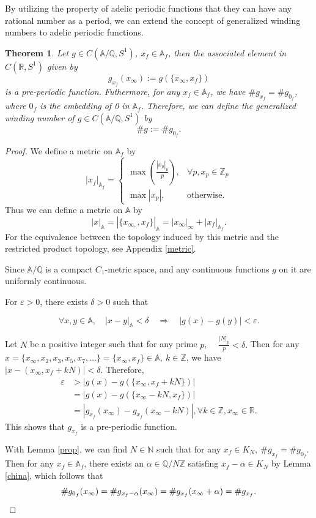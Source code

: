 \documentclass[11pt]{article}
\newtheorem{theorem}{Theorem}[section]  %
\newcommand{\A}{\mathbb{A}}
\theoremstyle{remark}
\begin{document}
By utilizing  the property of adelic periodic functions that they can have any rational number as a period, we can extend the concept of generalized winding numbers to adelic periodic functions. 
\begin{theorem}\label{gonggongwind}
    Let \( g \in C(\mathbb{A}/\mathbb{Q}, S^1) \), \( x_f \in \mathbb{A}_f \), then the associated element in \( C(\mathbb{R}, S^1) \) given by  
\[
g_{x_f}(x_\infty) := g(\{x_\infty, x_f\})
\]  
is a pre-periodic function. Futhermore, for any \( x_f \in \mathbb{A}_f\), we have \(\#g_{x_f}=\#g_{0_f}\), where \(0_f\) is the embedding of 0 in \(\A_f\). Therefore, we can define the generalized winding number of \( g \in C(\mathbb{A}/\mathbb{Q}, S^1) \) by
$$
\#g:=\#g_{0_f}.
$$
\end{theorem}
\begin{proof}
We define a metric on \(\A_f\) by
\[
|x_f|_{\A_f} = 
\begin{cases} 
\max \left( \frac{|x_p|_p}{p} \right), & \forall p, x_p \in \mathbb{Z}_p \\
\max |x_p|, & \text{otherwise}.
\end{cases}
\]
Thus we can define a metric on $\mathbb{A}$ by
$$
|x|_{\A}=|\{x_{\infty,},x_f\}|_{\A}=|x_{\infty}|_{\infty}+|x_f|_{\A_f}.
$$
For the equivalence between the topology induced by this metric and the restricted product topology, see Appendix \ref{metric}.

 Since \( \mathbb{A}/\mathbb{Q} \) is a compact \( C_1 \)-metric space, and any continuous functions $g$ on it are uniformly continuous.

For \( \varepsilon > 0 \), there exists \( \delta > 0 \) such that

\[
\forall x, y \in \mathbb{A}, \quad |x - y|_\mathbb{A} < \delta \quad \Rightarrow \quad |g(x) - g(y)| < \varepsilon.
\]

Let \( N \) be a positive integer such that for any prime $p$, \(
 \quad \frac{|N|_p}{p} < \delta.
\)
Then for any \( x = \{ x_\infty, x_2, x_3, x_5, x_7,\dots \} = \{ x_\infty, x_f \} \in \A,\ 
k \in \mathbb{Z}\), we have \( |x - (x_\infty, x_f + kN)| < \delta.
\)
Therefore,
\begin{align*}
    \varepsilon &> |g(x) - g(\{ x_\infty, x_f + kN \})| \\&= |g(x) - g(\{ x_\infty - kN, x_f \})| \\&= |g_{x_f}(x_\infty) - g_{x_f}(x_\infty - kN)|,\forall k\in \mathbb{Z}, x_{\infty}\in \mathbb{R}.
\end{align*}
This shows that $g_{x_f}$ is a pre-periodic function. 

With Lemma \ref{prop}, we can find $N\in \mathbb{N}$ such that for any $x_f\in K_N,\ \#g_{x_f}=\#g_{0_f}$. Then for any \(x_f\in \A_f \), there exists an $\alpha \in \mathbb{Q}/N\mathbb{Z}$ satisfing \( x_f-\alpha \in K_N\) by Lemma \ref{china}, which follows that
$$
\#g_{0_f}(x_{\infty})=\#g_{x_f-\alpha}(x_{\infty})=\#g_{x_f}(x_{\infty}+\alpha)=\#g_{x_f}.\qedhere
$$
\end{proof}
\end{document}
